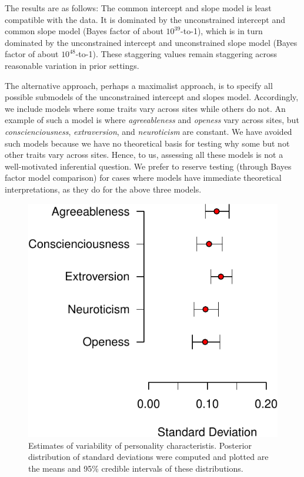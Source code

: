 \documentclass[english,man]{apa6}
\theoremstyle{definition}
\theoremstyle{definition}
\theoremstyle{definition}
\theoremstyle{remark}
\begin{document}
The results are as follows: The common intercept and slope model is
least compatible with the data. It is dominated by the unconstrained
intercept and common slope model (Bayes factor of about
\(10^{39}\)-to-1), which is in turn dominated by the unconstrained
intercept and unconstrained slope model (Bayes factor of about
\(10^{48}\)-to-1). These staggering values remain staggering across
reasonable variation in prior settings.

The alternative approach, perhaps a maximalist approach, is to specify
all possible submodels of the unconstrained intercept and slopes model.
Accordingly, we include models where some traits vary across sites while
others do not. An example of such a model is where \emph{agreeableness}
and \emph{openess} vary across sites, but \emph{conscienciousness},
\emph{extraversion}, and \emph{neuroticism} are constant. We have
avoided such models because we have no theoretical basis for testing why
some but not other traits vary across sites. Hence, to us, assessing all
these models is not a well-motivated inferential question. We prefer to
reserve testing (through Bayes factor model comparison) for cases where
models have immediate theoretical interpretations, as they do for the
above three models.

\begin{figure}[htbp]
\centering
\includegraphics{p_files/figure-latex/corkEst2-1.pdf}
\caption{\label{fig:corkEst2}Estimates of variability of personality
characteristis. Posterior distribution of standard deviations were
computed and plotted are the means and 95\% credible intervals of these
distributions.}
\end{figure}
\end{document}
